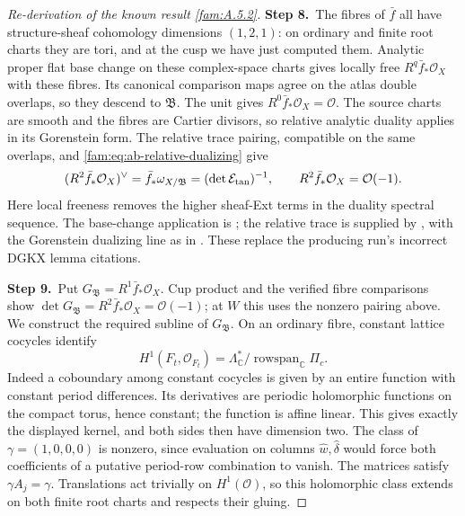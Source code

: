 \begin{proof}[Re-derivation of the known result \ref{fam:A.5.2}]
\par\smallskip\noindent\textbf{Step 8.}\ The fibres of $\bar f$ all have structure-sheaf cohomology dimensions
$(1,2,1)$: on ordinary and finite root charts they are tori, and at
the cusp we have just computed them. Analytic proper flat base change
on these complex-space charts gives locally free $R^q\bar f_*\mathcal O_X$
with these fibres. Its canonical comparison maps agree on the atlas
double overlaps, so they descend to $\mathfrak B$. The unit gives
$R^0\bar f_*\mathcal O_X=\mathcal O$.
The source charts are smooth and the fibres are Cartier divisors,
so relative analytic duality applies in its Gorenstein form. The
relative trace pairing, compatible on the same overlaps, and
\eqref{fam:eq:ab-relative-dualizing} give
\[
 (R^2\bar f_*\mathcal O_X)^\vee
 =\bar f_*\omega_{X/\mathfrak B}
 =(\det\mathcal E_{\rm tan})^{-1},
 \qquad R^2\bar f_*\mathcal O_X=\mathcal O(-1).
\]
Here local freeness removes the higher sheaf-Ext terms in the duality
spectral sequence. The base-change application is \cite[III.4.10 and III.4.12]{BS76}; the relative trace is supplied by \cite[pp.~261, 264--266]{RRV71}, with the Gorenstein dualizing line as in \cite[p.~91, Proposition 2]{RR70}. These replace the producing run's incorrect DGKX lemma citations.

\par\smallskip\noindent\textbf{Step 9.}\ Put $G_{\mathfrak B}=R^1\bar f_*\mathcal O_X$. Cup product and the verified fibre
comparisons show $\det G_{\mathfrak B}=R^2\bar f_*\mathcal O_X=\mathcal O(-1)$;
at $W$ this uses the nonzero pairing above.
We construct the required subline of $G_{\mathfrak B}$. On an ordinary fibre,
constant lattice cocycles identify
\[
 H^1(F_t,\mathcal O_{F_t})
 =\Lambda_{\mathbb C}^*/\operatorname{rowspan}_{\mathbb C}\Pi_c.
\]
Indeed a coboundary among constant cocycles is given by an entire
function with constant period differences. Its derivatives are
periodic holomorphic functions on the compact torus, hence constant;
the function is affine linear. This gives exactly the displayed
kernel, and both sides then have dimension two. The class of
$\gamma=(1,0,0,0)$ is nonzero, since evaluation on columns
$\widehat w,\widehat\delta$ would force both coefficients of a
putative period-row combination to vanish.
The matrices satisfy $\gamma A_j=\gamma$. Translations act trivially
on $H^1(\mathcal O)$, so this holomorphic class extends on both finite
root charts and respects their gluing.


\end{proof}
